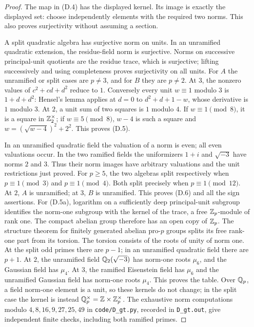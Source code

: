 \begin{proof}
The map in (D.4) has the displayed kernel.  Its image is exactly
the displayed set: choose independently elements with the required
two norms.  This also proves surjectivity without assuming a section.

A split quadratic algebra has surjective norm on units.  In an
unramified quadratic extension, the residue-field norm is
surjective.  Norms on successive principal-unit quotients are the
residue trace, which is surjective; lifting successively and using
completeness proves surjectivity on all units.  For \(A\) the
unramified or split cases are \(p\ne3\), and for \(B\) they are
\(p\ne2\).  At \(3\), the nonzero values of
\(c^2+cd+d^2\) reduce to \(1\).  Conversely every unit \(w\equiv1\)
modulo \(3\) is \(1+d+d^2\): Hensel's lemma applies at \(d=0\)
to \(d^2+d+1-w\), whose derivative is \(1\) modulo \(3\).
At \(2\), a unit sum of two squares is \(1\) modulo \(4\).
If \(w\equiv1\pmod8\), it is a square in \(\mathbb Z_2^\times\);
if \(w\equiv5\pmod8\), \(w-4\) is such a square and
\(w=(\sqrt{w-4})^2+2^2\).  This proves (D.5).

In an unramified quadratic field the valuation of a norm is even;
all even valuations occur.  In the two ramified fields the
uniformizers \(1+i\) and \(\sqrt{-3}\) have norms \(2\) and \(3\).
Thus their norm images have arbitrary valuations and the unit
restrictions just proved.  For \(p\ge5\), the two algebras split
respectively when \(p\equiv1\pmod3\) and \(p\equiv1\pmod4\).
Both split precisely when \(p\equiv1\pmod{12}\).
At \(2\), \(A\) is unramified; at \(3\), \(B\) is unramified.
This proves (D.6) and all the sign assertions.
For (D.5a), logarithm on a sufficiently deep principal-unit
subgroup identifies the norm-one subgroup with the kernel
of the trace, a free \(\mathbb Z_p\)-module of rank one.
The compact abelian group therefore has an open copy of
\(\mathbb Z_p\).  The structure theorem for finitely generated
abelian pro-\(p\) groups splits its free rank-one part from
its torsion.  The torsion consists of the roots of unity of
norm one.  At the split odd primes there are \(p-1\);
in an unramified quadratic field there are \(p+1\).
At \(2\), the unramified field \(\mathbb Q_2(\sqrt{-3})\) has norm-one
roots \(\mu_6\), and the Gaussian field has \(\mu_4\).
At \(3\), the ramified Eisenstein field has \(\mu_6\)
and the unramified Gaussian field has norm-one roots
\(\mu_4\).  This proves the table.
Over \(\mathbb Q_p\), a field norm-one element is a unit,
so these kernels do not change; in the split case the
kernel is instead \(\mathbb Q_p^\times=\mathbb Z\times\mathbb Z_p^\times\).
The exhaustive norm computations modulo \(4,8,16,9,27,25,49\)
in \texttt{code/D\_gt.py}, recorded in \texttt{D\_gt.out},
give independent finite checks, including both ramified primes.
\end{proof}

